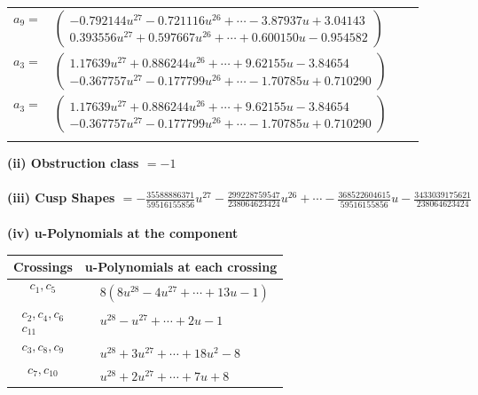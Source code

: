 \documentclass[1p]{elsarticle_modified}
\theoremstyle{definition}
\begin{document}
\begin{tabular}{m{7pt} m{180pt} m{7pt} m{180pt} }
\flushright $a_{9}=$&$\begin{pmatrix}-0.792144 u^{27}-0.721116 u^{26}+\cdots-3.87937 u+3.04143\\0.393556 u^{27}+0.597667 u^{26}+\cdots+0.600150 u-0.954582\end{pmatrix}$ \\
\flushright $a_{3}=$&$\begin{pmatrix}1.17639 u^{27}+0.886244 u^{26}+\cdots+9.62155 u-3.84654\\-0.367757 u^{27}-0.177799 u^{26}+\cdots-1.70785 u+0.710290\end{pmatrix}$\\ \flushright $a_{3}=$&$\begin{pmatrix}1.17639 u^{27}+0.886244 u^{26}+\cdots+9.62155 u-3.84654\\-0.367757 u^{27}-0.177799 u^{26}+\cdots-1.70785 u+0.710290\end{pmatrix}$\\&\end{tabular}
\flushleft \textbf{(ii) Obstruction class $= -1$}\\~\\
\flushleft \textbf{(iii) Cusp Shapes $= -\frac{35588886371}{59516155856} u^{27}-\frac{299228759547}{238064623424} u^{26}+\cdots-\frac{368522604615}{59516155856} u-\frac{3433039175621}{238064623424}$}\\~\\
\newpage\renewcommand{\arraystretch}{1}
\flushleft \textbf{(iv) u-Polynomials at the component}\newline \\
\begin{tabular}{m{50pt}|m{274pt}}
Crossings & \hspace{64pt}u-Polynomials at each crossing \\
\hline $$\begin{aligned}c_{1},c_{5}\end{aligned}$$&$\begin{aligned}
&8(8 u^{28}-4 u^{27}+\cdots+13 u-1)
\end{aligned}$\\
\hline $$\begin{aligned}c_{2},c_{4},c_{6}\\c_{11}\end{aligned}$$&$\begin{aligned}
&u^{28}- u^{27}+\cdots+2 u-1
\end{aligned}$\\
\hline $$\begin{aligned}c_{3},c_{8},c_{9}\end{aligned}$$&$\begin{aligned}
&u^{28}+3 u^{27}+\cdots+18 u^2-8
\end{aligned}$\\
\hline $$\begin{aligned}c_{7},c_{10}\end{aligned}$$&$\begin{aligned}
&u^{28}+2 u^{27}+\cdots+7 u+8
\end{aligned}$\\
\hline
\end{tabular}\\~\\
\end{document}

